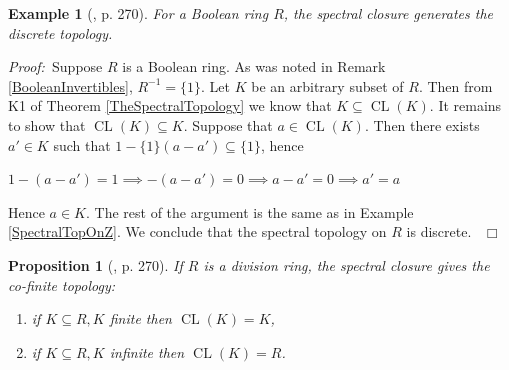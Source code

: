 \documentclass[12pt, oneside]{book}
\newtheorem{proposition}[theorem]{Proposition}
\newtheorem{example}[theorem]{Example}
\newcommand{\proof}{{\noindent \it Proof:~}}
\newcommand{\qed}{\hfill ~$\Box$\\}
\def\CL{\operatorname{CL}}
\begin{document}
\begin{example}[\cite{CH3}, p. 270] 
\normalfont
\noindent For a Boolean ring $R$, the spectral closure generates the discrete topology.

\end{example}

\proof Suppose $R$ is a Boolean ring. As was noted in Remark \ref{BooleanInvertibles}, $R^{-1}= \{ 1 \}$.
\vskip 0.3cm
\noindent Let $K$ be an arbitrary subset of $R$. Then from K1 of Theorem \ref{TheSpectralTopology} 
we know that $K \subseteq \CL(K)$. It remains to show that $\CL(K) \subseteq K$. 
Suppose that $a \in \CL(K)$. Then there exists $a' \in K$ 
such that $1- \{ 1 \} (a-a') \subseteq \{ 1 \}$, hence
\begin{center}
 $1-(a-a')=1 \implies -(a-a')=0 \implies a-a'=0 \implies a'=a$
\end{center}

\noindent Hence $a \in K$. The rest of the argument is the same as in Example \ref{SpectralTopOnZ}. 
We conclude that the spectral topology on $R$ is discrete. \qed

\begin{proposition}[\cite{CH3}, p. 270] \label{DivRing}
\normalfont
\noindent If $R$ is a division ring, the spectral closure gives the co-finite topology:
\begin{enumerate}[label=(\alph*)]
\item \quad if $K \subseteq R, K$ finite then $\CL(K)=K$,
\item \quad if $K \subseteq R, K$ infinite then $\CL(K)=R$.
\end{enumerate}
\end{proposition}
\end{document}
